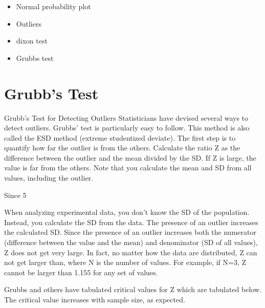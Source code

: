 
\begin{itemize}
\item Normal probability plot 
\item Outliers \item dixon test
\item Grubbs test
\end{itemize}

\section{Grubb's Test}

Grubb's Test for Detecting Outliers
Statisticians have devised several ways to detect outliers. Grubbs' test is particularly easy to follow. This method is also called the ESD method (extreme studentized deviate).
The first step is to quantify how far the outlier is from the others. Calculate the ratio Z as the difference between the outlier and the mean divided by the SD. If Z is large, the value is far from the others. Note that you calculate the mean and SD from all values, including the outlier.



Since 5%

When analyzing experimental data, you don't know the SD of the population. Instead, you calculate the SD from the data. The presence of an outlier increases the calculated SD. Since the presence of an outlier increases both the numerator (difference between the value and the mean) and denominator (SD of all values), Z does not get very large. In fact, no matter how the data are distributed, Z can not get larger than, where N is the number of values. For example, if N=3, Z cannot be larger than 1.155 for any set of values.

Grubbs and others have tabulated critical values for Z which are tabulated below. The critical value increases with sample size, as expected.

